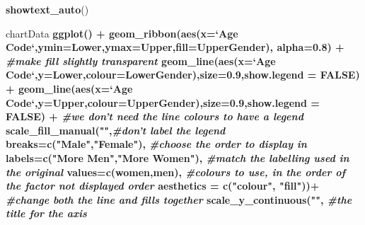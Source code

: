 \documentclass[]{article}
\newenvironment{Shaded}{\begin{snugshade}}{\end{snugshade}}
\newcommand{\KeywordTok}[1]{\textcolor[rgb]{0.13,0.29,0.53}{\textbf{#1}}}
\newcommand{\DataTypeTok}[1]{\textcolor[rgb]{0.13,0.29,0.53}{#1}}
\newcommand{\DecValTok}[1]{\textcolor[rgb]{0.00,0.00,0.81}{#1}}
\newcommand{\FloatTok}[1]{\textcolor[rgb]{0.00,0.00,0.81}{#1}}
\newcommand{\StringTok}[1]{\textcolor[rgb]{0.31,0.60,0.02}{#1}}
\newcommand{\CommentTok}[1]{\textcolor[rgb]{0.56,0.35,0.01}{\textit{#1}}}
\newcommand{\OtherTok}[1]{\textcolor[rgb]{0.56,0.35,0.01}{#1}}
\newcommand{\OperatorTok}[1]{\textcolor[rgb]{0.81,0.36,0.00}{\textbf{#1}}}
\newcommand{\NormalTok}[1]{#1}
\begin{document}
\begin{Shaded}
\begin{Highlighting}[]
\KeywordTok{showtext_auto}\NormalTok{()}

\NormalTok{chartData }\OperatorTok{%>%}\StringTok{ }\KeywordTok{filter}\NormalTok{(Year}\OperatorTok{==}\DecValTok{2014}\NormalTok{) }\OperatorTok{%>%}
\StringTok{  }\KeywordTok{ggplot}\NormalTok{() }\OperatorTok{+}
\StringTok{  }\KeywordTok{geom_ribbon}\NormalTok{(}\KeywordTok{aes}\NormalTok{(}\DataTypeTok{x=}\StringTok{`}\DataTypeTok{Age Code}\StringTok{`}\NormalTok{,}\DataTypeTok{ymin=}\NormalTok{Lower,}\DataTypeTok{ymax=}\NormalTok{Upper,}\DataTypeTok{fill=}\NormalTok{UpperGender),}
              \DataTypeTok{alpha=}\FloatTok{0.8}\NormalTok{) }\OperatorTok{+}\StringTok{ }\CommentTok{#make fill slightly transparent}
\StringTok{  }\KeywordTok{geom_line}\NormalTok{(}\KeywordTok{aes}\NormalTok{(}\DataTypeTok{x=}\StringTok{`}\DataTypeTok{Age Code}\StringTok{`}\NormalTok{,}\DataTypeTok{y=}\NormalTok{Lower,}\DataTypeTok{colour=}\NormalTok{LowerGender),}\DataTypeTok{size=}\FloatTok{0.9}\NormalTok{,}\DataTypeTok{show.legend =} \OtherTok{FALSE}\NormalTok{) }\OperatorTok{+}\StringTok{ }
\StringTok{  }\KeywordTok{geom_line}\NormalTok{(}\KeywordTok{aes}\NormalTok{(}\DataTypeTok{x=}\StringTok{`}\DataTypeTok{Age Code}\StringTok{`}\NormalTok{,}\DataTypeTok{y=}\NormalTok{Upper,}\DataTypeTok{colour=}\NormalTok{UpperGender),}\DataTypeTok{size=}\FloatTok{0.9}\NormalTok{,}\DataTypeTok{show.legend =} \OtherTok{FALSE}\NormalTok{) }\OperatorTok{+}\StringTok{ }\CommentTok{#we don't need the line colours to have a legend}
\StringTok{  }\KeywordTok{scale_fill_manual}\NormalTok{(}\StringTok{""}\NormalTok{,}\CommentTok{#don't label the legend}
                    \DataTypeTok{breaks=}\KeywordTok{c}\NormalTok{(}\StringTok{"Male"}\NormalTok{,}\StringTok{"Female"}\NormalTok{), }\CommentTok{#choose the order to display in }
                    \DataTypeTok{labels=}\KeywordTok{c}\NormalTok{(}\StringTok{"More Men"}\NormalTok{,}\StringTok{"More Women"}\NormalTok{), }\CommentTok{#match the labelling used in the original}
                    \DataTypeTok{values=}\KeywordTok{c}\NormalTok{(women,men), }\CommentTok{#colours to use, in the order of the factor not displayed order}
                    \DataTypeTok{aesthetics =} \KeywordTok{c}\NormalTok{(}\StringTok{"colour"}\NormalTok{, }\StringTok{"fill"}\NormalTok{))}\OperatorTok{+}\StringTok{ }\CommentTok{#change both the line and fills together}
\StringTok{  }\KeywordTok{scale_y_continuous}\NormalTok{(}\StringTok{""}\NormalTok{, }\CommentTok{#the title for the axis}
}
\end{Highlighting}
\end{Shaded}
\end{document}
